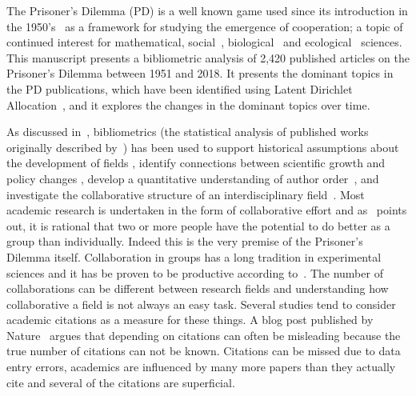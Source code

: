 The Prisoner's Dilemma (PD) is a well known game used since its introduction in
the 1950's~\cite{Flood1958} as a framework for studying the emergence of
cooperation; a topic of continued interest for mathematical,
social~\cite{Perc2008}, biological~\cite{turner1999prisoner} and
ecological~\cite{Wu2011} sciences. This manuscript presents a bibliometric
analysis of 2,420 published articles on the Prisoner's Dilemma between 1951 and
2018. It presents the dominant topics in the PD publications, which have been
identified using Latent Dirichlet Allocation~\cite{Blei2003}, and it explores the changes in the
dominant topics over time. 

As discussed in~\cite{youngblood2018}, bibliometrics (the statistical analysis
of published works originally described by~\cite{pritchard1969}) has been used
to support historical assumptions about the development of fields
\cite{raina1998}, identify connections between scientific growth and policy
changes \cite{das2016}, develop a quantitative understanding of author
order~\cite{sekara2018}, and investigate the collaborative structure of an
interdisciplinary field~\cite{Liu2015}. Most academic research is undertaken in
the form of collaborative effort and as~\cite{Kyvik2017} points out, it is
rational that two or more people have the potential to do better as a group
than individually. Indeed this is the very premise of the Prisoner's Dilemma itself.
Collaboration in groups has a long tradition in experimental
sciences and it has be proven to be productive according
to~\cite{Etzkowitz1992}. The number of collaborations can be different
between research fields and understanding how collaborative a field is not
always an easy task. Several studies tend to consider academic citations as a
measure for these things. A blog post published by Nature~\cite{nature_blog}
argues that depending on citations can often be misleading because the true
number of citations can not be known. Citations can be missed due to data entry
errors, academics are influenced by many more papers than they actually cite and
several of the citations are superficial.

